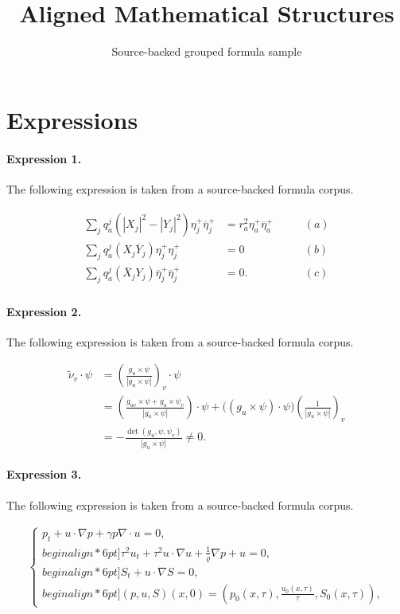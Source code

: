 \documentclass[11pt]{article}
\title{Aligned Mathematical Structures}
\author{Source-backed grouped formula sample}
\date{}
\begin{document}
\maketitle
\section{Expressions}
\paragraph{Expression 1.} The following expression is taken from a source-backed formula corpus.

\begin{align*}\begin{array}{lcr}\sum\limits_{j}q^j_a(|X_j|^2-|Y_j|^2)\eta_j^+\overline{\eta}_j^+&=r^2_a\eta_a^+\overline{\eta}_a^+ \qquad &(a)\\\sum\limits_{j}q^j_a(X_j\overline{Y}_j)\eta_j^+{\eta}_j^+&=0 \qquad &(b)\\\sum\limits_{j}q^j_a(\overline {X}_j{Y_j})\overline{\eta}_j^+\overline{\eta}_j^+&=0. \qquad &(c)\end{array}\end{align*}

\paragraph{Expression 2.} The following expression is taken from a source-backed formula corpus.

\begin{align*} \tilde\nu_v\cdot \psi&= \left(\frac{g_u\times\psi}{|g_u\times\psi|}\right)_v \cdot \psi\\ &= \left(\frac{g_{uv}\times\psi+g_u\times\psi_v}{|g_u\times\psi|}\right) \cdot\psi + \bigl((g_u\times\psi)\cdot\psi\bigr)\left(\frac{1}{|g_u\times\psi|}\right)_v\\ &=-\frac{\det(g_u,\psi,\psi_v)}{|g_u\times\psi|}\neq 0. \end{align*}

\paragraph{Expression 3.} The following expression is taken from a source-backed formula corpus.

\begin{align*}\left\{\begin{array}{ll}p_t + u\cdot\nabla p + \gamma p\nabla\cdot u = 0, \\begin{align*}6pt]\tau^2 u_t + \tau^2 u\cdot\nabla u + \frac{1}{\varrho}\nabla p + u =0, \\begin{align*}6pt]S_t + u\cdot\nabla S =0, \\begin{align*}6pt](p,u,S)(x,0)=(p_0(x,\tau), \frac{u_0(x,\tau)}{\tau}, S_0(x,\tau)),\end{array}\right.\end{align*}
\end{document}
